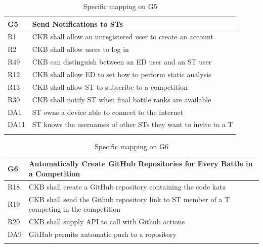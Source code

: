   \begin{longtable}{|l|p{12cm}|}
    \hline
    \textbf{G5} & \textbf{Send Notifications to STs}      \\
    \hline
    R1 & CKB shall allow an unregistered user to create an account \\
    \hline
    R2 & CKB shall allow users to log in \\
    \hline
    R49 & CKB can distinguish between an ED user and an ST user \\
    \hline
    R12 & CKB shall allow ED to set how to perform static analysis \\
    \hline
    R13 & CKB shall allow ST to subscribe to a competition \\
    \hline
    R30 & CKB shall notify ST when final battle ranks are available \\
    \hline
    DA1 & ST owns a device able to connect to the internet \\
    \hline
    DA11 & ST knows the usernames of other STs they want to invite to a T \\
    \hline

    \caption{Specific mapping on G5}
    \label{tab:mappingG5}
  \end{longtable}

  \begin{longtable}{|l|p{12cm}|}
    \hline
    \textbf{G6} & \textbf{Automatically Create GitHub Repositories for Every Battle in a Competition}      \\
    \hline
    R18 & CKB shall create a GitHub repository containing the code kata \\
    \hline
    R19 & CKB shall send the Github repository link to ST member of a T competing in the competition \\
    \hline
    R20 & CKB shall supply API to call with Github actions \\
    \hline
    DA9 & GitHub permits automatic push to a repository \\
    \hline

    \caption{Specific mapping on G6}
    \label{tab:mappingG6}
  \end{longtable}
  
